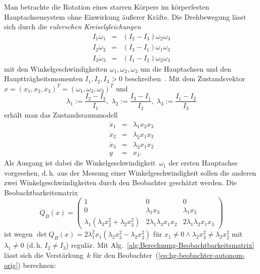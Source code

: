 \begin{example}
\label{exa:Kreisel-autonom-high-gain}Man betrachte die Rotation eines
starren Körpers im körper\-festen Hauptachsensystem ohne Einwirkung
äußerer Kräfte. Die Drehbewegung lässt sich durch die \emph{eulerschen
Kreiselgleichungen} 
\[
\begin{array}{lcl}
I_{1}\dot{\omega}_{1} & = & (I_{2}-I_{3})\omega_{2}\omega_{3}\\
I_{2}\dot{\omega}_{2} & = & (I_{3}-I_{1})\omega_{1}\omega_{3}\\
I_{3}\dot{\omega}_{3} & = & (I_{1}-I_{2})\omega_{2}\omega_{3}
\end{array}
\]
mit den Winkelgeschwindigkeiten $\omega_{1},\omega_{2},\omega_{3}$
um die Hauptachsen und den Hauptträgheitsmomenten $I_{1},I_{2},I_{3}>0$
beschreiben~\cite{magnus1971,arnold1989,marsden2001}. Mit dem Zustandsvektor
$x=(x_{1},x_{2},x_{3})^{T}=(\omega_{1},\omega_{2},\omega_{3})^{T}$
und
\[
\lambda_{1}:=\frac{I_{2}-I_{3}}{I_{1}},\;\lambda_{2}:=\frac{I_{3}-I_{1}}{I_{2}},\;\lambda_{3}:=\frac{I_{1}-I_{2}}{I_{3}}
\]
erhält man das Zustandsraummodell 
\begin{equation}
\begin{array}{lcl}
\dot{x}_{1} & = & \lambda_{1}x_{2}x_{3}\\
\dot{x}_{2} & = & \lambda_{2}x_{1}x_{3}\\
\dot{x}_{3} & = & \lambda_{3}x_{1}x_{2}\\
y & = & x_{1}.
\end{array}\label{eq:hg-kreiselmodell}
\end{equation}
Als Ausgang ist dabei die Winkelgeschwindigkeit~$\omega_{1}$ der
ersten Hauptachse vorgesehen, d.\,h. aus der Messung einer Winkelgeschwindigkeit
sollen die anderen zwei Winkelgeschwindigkeiten durch den Beobachter
geschätzt werden. Die Beobachtbarkeitsmatrix 
\[
Q_{B}(x)=\left(\begin{array}{ccc}
1 & 0 & 0\\
0 & \lambda_{1}x_{3} & \lambda_{1}x_{2}\\
\lambda_{1}\left(\lambda_{3}x_{2}^{2}+\lambda_{2}x_{3}^{2}\right) & 2\lambda_{1}\lambda_{3}x_{1}x_{2} & 2\lambda_{1}\lambda_{2}x_{1}x_{3}
\end{array}\right)
\]
ist wegen $\det Q_{B}(x)=2\lambda_{1}^{2}x_{1}(\lambda_{2}x_{3}^{2}-\lambda_{2}x_{2}^{2})$
für $x_{1}\neq0\wedge\lambda_{2}x_{3}^{2}\neq\lambda_{2}x_{2}^{2}$
mit $\lambda_{1}\neq0$ (d.\,h. $I_{2}\neq I_{3}$) regulär. Mit
Alg.~\ref{alg:Berechnung-Beobachtbarkeitsmatrix} lässt sich die
Verstärkung~$k$ für den Beobachter~(\ref{eq:hg-beobachter-autonom-orig})
berechnen:


\end{example}
